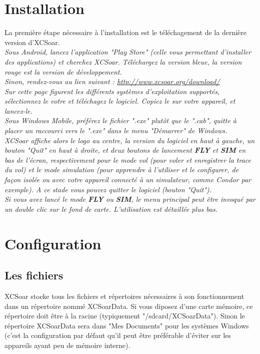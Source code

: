 \documentclass{article}
\begin{document}
\section{Installation}
\noindent
La première étape nécessaire à l'installation est le téléchagement de la dernière version d'XCSoar.\\
%
\newline
%
\itshape Sous Android, lancez l'application "Play Store" (celle vous permettant d'installer des applications) et cherchez XCSoar. Téléchargez la version bleue, la version rouge est la version de développement.\upshape\\
\newline
Sinon, rendez-vous au lien suivant : \url{http://www.xcsoar.org/download/}\\
Sur cette page figurent les différents systèmes d'exploitation supportés, sélectionnez le votre et téléchagez le logiciel. Copiez le sur votre appareil, et lancez-le.\\
%
\newline
%
\itshape Sous Windows Mobile, préférez le fichier ".exe" plutôt que le ".cab", quitte à placer un raccourci vers le ".exe" dans le menu "Démarrer" de Windows.\upshape\\
\newline
XCSoar affiche alors le logo au centre, la version du logiciel en haut à gauche, un bouton "Quit" en haut à droite, et deux boutons de lancement \textbf{FLY} et \textbf{SIM} en bas de l'écran, respectivement pour le mode vol (pour voler et enregistrer la trace du vol) et le mode simulation (pour apprendre à l'utiliser et le configurer, de façon isolée ou avec votre appareil connecté à un simulateur, comme Condor par exemple). A ce stade vous pouvez quitter le logiciel (bouton "Quit").\\
%
Si vous avez lancé le mode \textbf{FLY} ou \textbf{SIM}, le menu principal peut être invoqué par un double clic sur le fond de carte.
L'utilisation est détaillée plus bas.
%
\section{Configuration}
%
\subsection{Les fichiers}
\noindent
XCSoar stocke tous les fichiers et répertoires nécessaires à son fonctionnement dans un répertoire nommé XCSoarData. Si vous diposez d'une carte mémoire, ce répertoire doit être à la racine (typiquement "/sdcard/XCSoarData"). Sinon le répertoire XCSoarData sera dans "Mes Documents" pour les systèmes Windows (c'est la configuration par défaut qu'il peut être préférable d'éviter sur les appareils ayant peu de mémoire interne).\\
\end{document}
